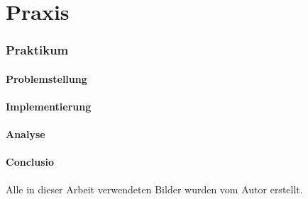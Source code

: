 \documentclass[%
			paper=a4,%
			DIV12,
			liststotoc,
			bibtotoc,
			draft=false,%
			titlepage
			]{scrartcl}
\begin{document}
\part{Praxis}

\section{Praktikum}

\subsection{Problemstellung}

\subsection{Implementierung}

\subsection{Analyse}

\subsection{Conclusio}

\newpage

\listoffigures

Alle in dieser Arbeit verwendeten Bilder wurden vom Autor erstellt.

\newpage

\nocite{*} %

\end{document}
